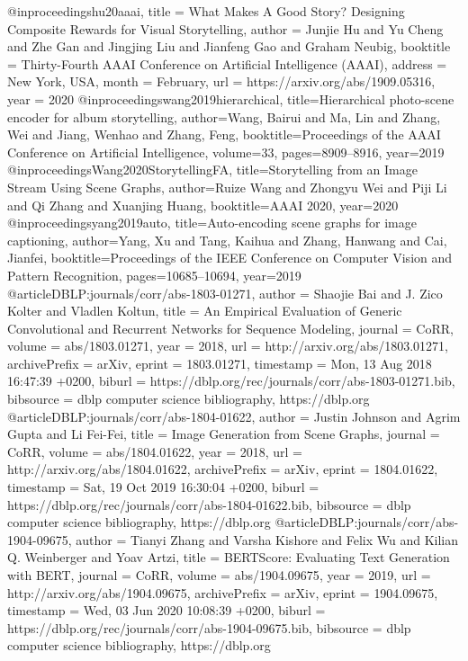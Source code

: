 @inproceedings{hu20aaai,
    title = {What Makes A Good Story? {D}esigning Composite Rewards for Visual Storytelling},
    author = {Junjie Hu and Yu Cheng and Zhe Gan and Jingjing Liu and Jianfeng Gao and Graham Neubig},
    booktitle = {Thirty-Fourth AAAI Conference on Artificial Intelligence (AAAI)},
    address = {New York, USA},
    month = {February},
    url = {https://arxiv.org/abs/1909.05316},
    year = {2020}
}
@inproceedings{wang2019hierarchical,
  title={Hierarchical photo-scene encoder for album storytelling},
  author={Wang, Bairui and Ma, Lin and Zhang, Wei and Jiang, Wenhao and Zhang, Feng},
  booktitle={Proceedings of the AAAI Conference on Artificial Intelligence},
  volume={33},
  pages={8909--8916},
  year={2019}
}
@inproceedings{Wang2020StorytellingFA,
  title={Storytelling from an Image Stream Using Scene Graphs},
  author={Ruize Wang and Zhongyu Wei and Piji Li and Qi Zhang and Xuanjing Huang},
  booktitle={AAAI 2020},
  year={2020}
}
@inproceedings{yang2019auto,
  title={Auto-encoding scene graphs for image captioning},
  author={Yang, Xu and Tang, Kaihua and Zhang, Hanwang and Cai, Jianfei},
  booktitle={Proceedings of the IEEE Conference on Computer Vision and Pattern Recognition},
  pages={10685--10694},
  year={2019}
}
@article{DBLP:journals/corr/abs-1803-01271,
  author    = {Shaojie Bai and
               J. Zico Kolter and
               Vladlen Koltun},
  title     = {An Empirical Evaluation of Generic Convolutional and Recurrent Networks
               for Sequence Modeling},
  journal   = {CoRR},
  volume    = {abs/1803.01271},
  year      = {2018},
  url       = {http://arxiv.org/abs/1803.01271},
  archivePrefix = {arXiv},
  eprint    = {1803.01271},
  timestamp = {Mon, 13 Aug 2018 16:47:39 +0200},
  biburl    = {https://dblp.org/rec/journals/corr/abs-1803-01271.bib},
  bibsource = {dblp computer science bibliography, https://dblp.org}
}
@article{DBLP:journals/corr/abs-1804-01622,
  author    = {Justin Johnson and
               Agrim Gupta and
               Li Fei{-}Fei},
  title     = {Image Generation from Scene Graphs},
  journal   = {CoRR},
  volume    = {abs/1804.01622},
  year      = {2018},
  url       = {http://arxiv.org/abs/1804.01622},
  archivePrefix = {arXiv},
  eprint    = {1804.01622},
  timestamp = {Sat, 19 Oct 2019 16:30:04 +0200},
  biburl    = {https://dblp.org/rec/journals/corr/abs-1804-01622.bib},
  bibsource = {dblp computer science bibliography, https://dblp.org}
}
@article{DBLP:journals/corr/abs-1904-09675,
  author    = {Tianyi Zhang and
               Varsha Kishore and
               Felix Wu and
               Kilian Q. Weinberger and
               Yoav Artzi},
  title     = {BERTScore: Evaluating Text Generation with {BERT}},
  journal   = {CoRR},
  volume    = {abs/1904.09675},
  year      = {2019},
  url       = {http://arxiv.org/abs/1904.09675},
  archivePrefix = {arXiv},
  eprint    = {1904.09675},
  timestamp = {Wed, 03 Jun 2020 10:08:39 +0200},
  biburl    = {https://dblp.org/rec/journals/corr/abs-1904-09675.bib},
  bibsource = {dblp computer science bibliography, https://dblp.org}
}

